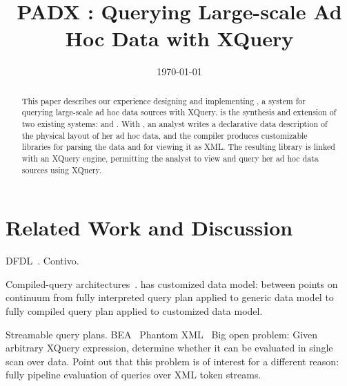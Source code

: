 \documentclass[nocopyrightspace]{sigplanconf}
\title{PADX : Querying Large-scale Ad Hoc Data with XQuery}
\date{\today}
\begin{document}
\maketitle
\begin{abstract}

This paper describes our experience designing and implementing
\padx{}, a system for querying large-scale ad hoc data sources with
XQuery.  \padx{} is the synthesis and extension of two existing
systems: \pads{} and \Galax{}. With \padx{}, an analyst writes a
declarative data description of the physical layout of her ad hoc
data, and the \pads{} compiler produces customizable libraries for
parsing the data and for viewing it as XML.  The resulting library is
linked with an XQuery engine, permitting the analyst to view and query
her ad hoc data sources using XQuery.
\end{abstract}







\section{Related Work and Discussion}
\label{section:relatedwork}
\label{section:future}

DFDL~\cite{dfdl}. Contivo.  


Compiled-query architectures~\cite{daytona}.  \padx{} has customized
data model: between points on continuum from fully interpreted query
plan applied to generic data model to fully compiled query plan
applied to customized data model.

Streamable query plans. 
BEA~\cite{DBLP:journals/vldb/FlorescuHKLRWCS04}
Phantom XML~\cite{rose:villard:2005}
Big open problem: Given arbitrary XQuery expression, determine whether
it can be evaluated in single scan over data.  Point out that this
problem is of interest for a different reason: fully pipeline
evaluation of queries over XML token streams.
\end{document}
